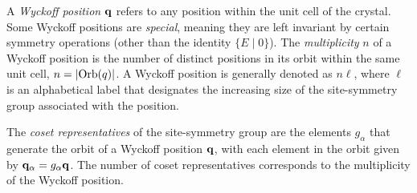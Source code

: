 \documentclass[12pt]{report}
\begin{document}
%
%

\begin{definition} \label{def:wyckpos}
A \textit{Wyckoff position} \( {\vb{q}} \) refers to any position within the unit cell of the crystal. Some Wyckoff positions are \textit{special}, meaning they are left invariant by certain symmetry operations (other than the identity $\{E \mid 0\}$). The \textit{multiplicity} $n$ of a Wyckoff position is the number of distinct positions in its orbit within the same unit cell, $n = \abs{\text{Orb}(q)}$. A Wyckoff position is generally denoted as \( n\ell \), where \( \ell \) is an alphabetical label that designates the increasing size of the site-symmetry group associated with the position.
\end{definition}


\begin{definition} \label{def:cosetrep_wyckoff}
The \textit{coset representatives} of the site-symmetry group are the elements \( g_\alpha \) that generate the orbit of a Wyckoff position \( {\vb{q}} \), with each element in the orbit given by \( {\vb{q}}_\alpha = g_\alpha {\vb{q}} \). The number of coset representatives corresponds to the multiplicity of the Wyckoff position.
\end{definition}
\end{document}
